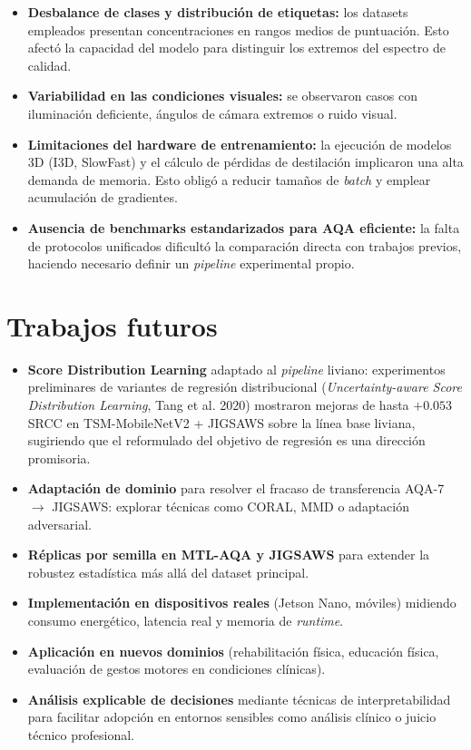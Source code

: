 \begin{itemize}
    \item \textbf{Desbalance de clases y distribución de etiquetas:} los datasets empleados presentan concentraciones en rangos medios de puntuación. Esto afectó la capacidad del modelo para distinguir los extremos del espectro de calidad.

    \item \textbf{Variabilidad en las condiciones visuales:} se observaron casos con iluminación deficiente, ángulos de cámara extremos o ruido visual.

    \item \textbf{Limitaciones del hardware de entrenamiento:} la ejecución de modelos 3D (\ac{I3D}, SlowFast) y el cálculo de pérdidas de destilación implicaron una alta demanda de memoria. Esto obligó a reducir tamaños de \textit{batch} y emplear acumulación de gradientes.

    \item \textbf{Ausencia de benchmarks estandarizados para AQA eficiente:} la falta de protocolos unificados dificultó la comparación directa con trabajos previos, haciendo necesario definir un \textit{pipeline} experimental propio.
\end{itemize}

\section{Trabajos futuros}

\begin{itemize}
    \item \textbf{Score Distribution Learning} adaptado al \textit{pipeline} liviano: experimentos preliminares de variantes de regresión distribucional (\textit{Uncertainty-aware Score Distribution Learning}, Tang et al. 2020) mostraron mejoras de hasta $+0.053$ \ac{SRCC} en TSM-MobileNetV2 + JIGSAWS sobre la línea base liviana, sugiriendo que el reformulado del objetivo de regresión es una dirección promisoria.

    \item \textbf{Adaptación de dominio} para resolver el fracaso de transferencia AQA-7 $\to$ JIGSAWS: explorar técnicas como CORAL, MMD o adaptación adversarial.

    \item \textbf{Réplicas por semilla en MTL-AQA y JIGSAWS} para extender la robustez estadística más allá del dataset principal.

    \item \textbf{Implementación en dispositivos reales} (Jetson Nano, móviles) midiendo consumo energético, latencia real y memoria de \textit{runtime}.

    \item \textbf{Aplicación en nuevos dominios} (rehabilitación física, educación física, evaluación de gestos motores en condiciones clínicas).

    \item \textbf{Análisis explicable de decisiones} mediante técnicas de interpretabilidad para facilitar adopción en entornos sensibles como análisis clínico o juicio técnico profesional.
\end{itemize}
